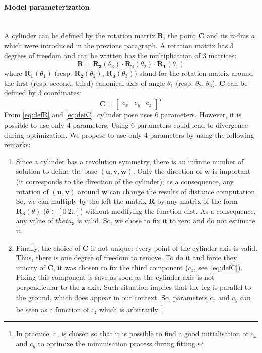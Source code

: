 \documentclass[letterpaper, 10 pt, conference]{ieeeconf}
\newcommand{\CJ}[2]{\textcolor{red}{#1}} %
\begin{document}
\paragraph{Model parameterization}~\\
A cylinder can be defined by the rotation matrix $\mathbf{R}$, the point $\mathbf{C}$ and its radius $a$ which were introduced in the previous paragraph. A rotation matrix has 3 degrees of freedom and can be written has the multiplication of 3 matrices:
\begin{equation}
	\mathbf{R} = \mathbf{R_3}(\theta_3)\cdot\mathbf{R_2}(\theta_2)\cdot\mathbf{R_1}(\theta_1)
	\label{eq:defR}
\end{equation}
where $\mathbf{R_1}(\theta_1)$ (resp. $\mathbf{R_2}(\theta_2)$, $\mathbf{R_3}(\theta_3)$) stand for the rotation matrix around the first (resp. second, third) canonical axis of angle $\theta_1$ (resp. $\theta_2$, $\theta_3$). $\mathbf{C}$ can be defined by 3 coordinates:
\begin{equation}
	\mathbf{C} = \begin{bmatrix}
			c_x & c_y & c_z
		\end{bmatrix}^T
	\label{eq:defC}
\end{equation}
From \eqref{eq:defR} and \eqref{eq:defC}, cylinder pose uses 6 parameters. However, it is possible to use only 4 parameters. Using 6 parameters could lead to divergence during optimization. We propose to use only 4 parameters by using the following remarks: 
\begin{enumerate}
	\item Since a cylinder has a revolution symmetry, there is an infinite number of solution to define the base $(\mathbf{u},\mathbf{v},\mathbf{w})$. Only the direction of $\mathbf{w}$ is important (it corresponds to the direction of the cylinder); as a consequence, any rotation of $(\mathbf{u},\mathbf{v})$ around $\mathbf{w}$ can change the results of distance computation. So, we can multiply by the left the matrix $\mathbf{R}$ by any matrix of the form $\mathbf{R_3}(\theta)$ ($\theta\in[0\ 2\pi]$) without modifying the function $\mathrm{dist}$. As a consequence, any value of $theta_3$ is valid. So, we chose to fix it to zero and do not estimate it.
	\item Finally, the choice of $\mathbf{C}$ is not unique: every point of the cylinder axis is valid. Thus, there is one degree of freedom to remove. To do it and force they unicity of $\mathbf{C}$, it was chosen to fix the third component ($c_z$, see~\eqref{eq:defC}). Fixing this component is save as soon as the cylinder axis is not perpendicular to the $\mathbf{z}$ axis.\CJ{}{\footnote{Which corresponds to the direction perpendicular to the ground, see paragraph~\ref{}}} Such situation implies that the leg is parallel to the ground, which does appear in our context. So, parameters $c_x$ and $c_y$ can be seen as a function of $c_z$ which is arbitrarily \footnote{In practice. $c_z$ is chosen so that it is possible to find a good initialisation of $c_x$ and $c_y$ to optimize the minimisation process during fitting.}
\end{enumerate}
\end{document}
